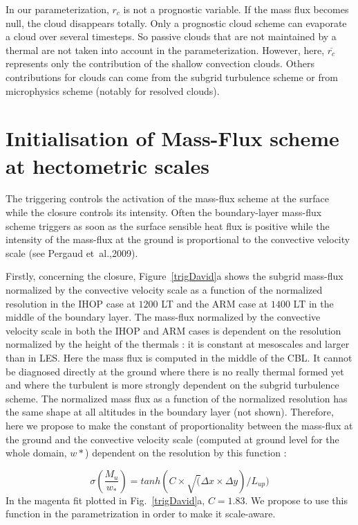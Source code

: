 In our parameterization, $r_c$ is not a prognostic variable. If the mass flux becomes null, the cloud disappears totally. Only a prognostic cloud scheme can evaporate a cloud over several timesteps. So passive clouds that are not maintained by a thermal are not taken into account in the parameterization. However, here, $\overline{r_c}$ represents only the contribution of the shallow convection clouds. Others contributions for clouds can come from the subgrid turbulence scheme or from microphysics scheme (notably for resolved clouds). 

\section{Initialisation of Mass-Flux scheme at hectometric scales}

The triggering controls the activation of the mass-flux scheme at the surface while the closure controls its intensity. Often the boundary-layer mass-flux scheme triggers as soon as the surface sensible heat flux is positive while the intensity of the mass-flux at the ground is proportional to the convective velocity scale (see Pergaud et~al.,2009). 

Firstly, concerning the closure, Figure~\ref{trigDavid}a shows the subgrid mass-flux normalized by the convective velocity scale as a function of the normalized resolution in the IHOP case at $1200$ LT and the ARM case at $1400$ LT in the middle of the boundary layer. The mass-flux normalized by the convective velocity scale in both the IHOP and ARM cases is dependent on the resolution normalized by the height of the thermals : it is constant at mesoscales and larger than in LES. Here the mass flux is computed in the middle of the CBL. It cannot be diagnosed directly at the ground where there is no really thermal formed yet and where the turbulent is more strongly dependent on the subgrid turbulence scheme. The normalized mass flux as a function of the normalized resolution has the same shape at all altitudes in the boundary layer (not shown). Therefore, here we propose to make the constant of proportionality between the mass-flux at the ground and the convective velocity scale (computed at ground level for the whole domain, $w*$) dependent on the resolution by this function :

\begin{equation}
	\sigma(\frac{M_u}{w_*})=tanh(C\times\sqrt(\Delta x \times \Delta y)/L_{up})
\label{eq:MuHect}
\end{equation}
In the magenta fit plotted in Fig.~\ref{trigDavid}a, $C=1.83$. We propose to use this function in the parametrization in order to make it scale-aware.

